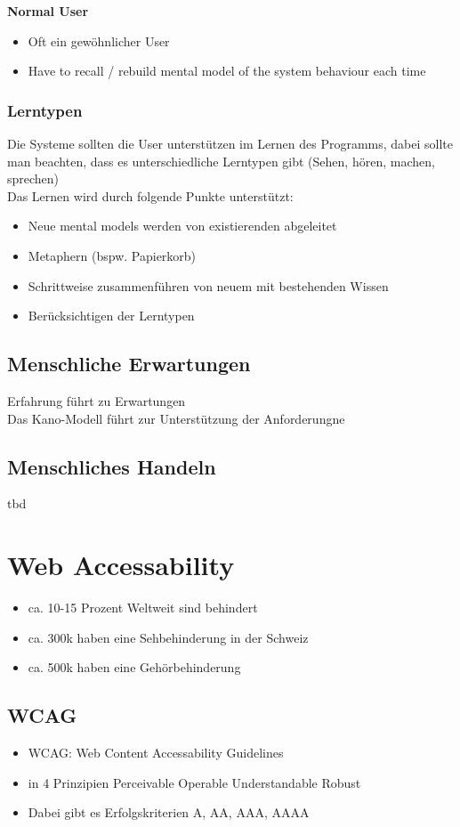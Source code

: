 \documentclass{report}
\theoremstyle{definition}
\theoremstyle{example}
\begin{document}
\textbf{Normal User}
\begin{itemize}
   \item Oft ein gewöhnlicher User
   \item Have to recall / rebuild mental model of the system behaviour each time
\end{itemize}

\subsection{Lerntypen}
Die Systeme sollten die User unterstützen im Lernen des Programms, dabei sollte man beachten, dass es unterschiedliche Lerntypen gibt (Sehen, hören, machen, sprechen)\\
Das Lernen wird durch folgende Punkte unterstützt:
\begin{itemize}
   \item Neue mental models werden von existierenden abgeleitet
   \item Metaphern (bspw. Papierkorb)
   \item Schrittweise zusammenführen von neuem mit bestehenden Wissen
   \item Berücksichtigen der Lerntypen
\end{itemize}

\section{Menschliche Erwartungen}
Erfahrung führt zu Erwartungen\\
Das Kano-Modell führt zur Unterstützung der Anforderungne

\section{Menschliches Handeln}
tbd



\chapter{Web Accessability}
\begin{itemize}
   \item ca. 10-15 Prozent Weltweit sind behindert
   \item ca. 300k haben eine Sehbehinderung in der Schweiz
   \item ca. 500k haben eine Gehörbehinderung
\end{itemize}

\section{WCAG}
\begin{itemize}
   \item WCAG: Web Content Accessability Guidelines
   \item in 4 Prinzipien
   \subitem Perceivable
   \subitem Operable
   \subitem Understandable
   \subitem Robust
   \item Dabei gibt es Erfolgskriterien A, AA, AAA, AAAA 
\end{itemize}
\end{document}
